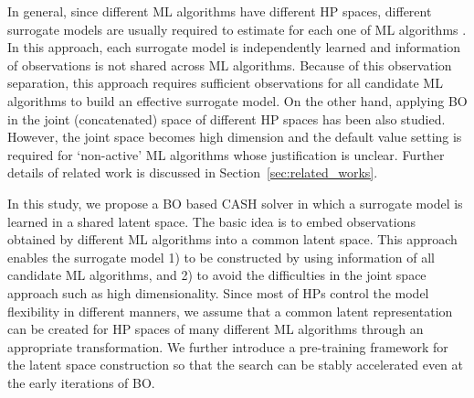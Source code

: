 In general, since different ML algorithms have different HP spaces, different surrogate models are usually required to estimate for each one of ML algorithms \cite{nguyen2020bayesian}.
%
In this approach, each surrogate model is independently learned and information of observations is not shared across ML algorithms. 
%
Because of this observation separation, this approach requires sufficient observations for all candidate ML algorithms to build an effective surrogate model.
%
On the other hand, applying BO in the joint (concatenated) space of different HP spaces \cite{hutter2011sequential} has been also studied.
%
However, the joint space becomes high dimension and the default value setting is required for `non-active' ML algorithms whose justification is unclear.
%
Further details of related work is discussed in Section~\ref{sec:related_works}.


In this study, we propose a BO based CASH solver in which a surrogate model is learned in a shared latent space.
%
The basic idea is to embed observations obtained by different ML algorithms into a common latent space.
%
This approach enables the surrogate model 1) to be constructed by using information of all candidate ML algorithms, and 2) to avoid the difficulties in the joint space approach such as high dimensionality.
%
Since most of HPs control the model flexibility in different manners, we assume that a common latent representation can be created for HP spaces of many different ML algorithms through an appropriate transformation.  
%
%
We further introduce a pre-training framework for the latent space construction so that the search can be stably accelerated even at the early iterations of BO.


